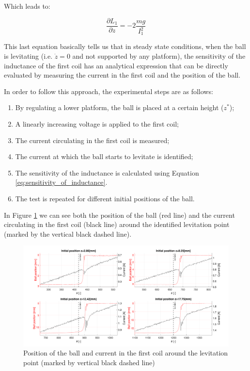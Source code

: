 Which leads to:

\begin{equation}
    \frac{\partial L_1}{\partial z} = -2 \frac{m g}{I_1^2}
    \label{eq:sensitivity_of_inductance}
\end{equation}

This last equation basically tells us that in steady state conditions, when the ball is levitating (i.e. $\dot{z} = 0$ and not supported by any platform), the sensitivity of the inductance of the first coil has an analytical expression that can be directly evaluated by measuring the current in the first coil and the position of the ball.

In order to follow this approach, the experimental steps are as follows:

\begin{enumerate}
    \item By regulating a lower platform, the ball is placed at a certain height ($z^*$);
    \item A linearly increasing voltage is applied to the first coil;
    \item The current circulating in the first coil is measured;
    \item The current at which the ball starts to levitate is identified;
    \item The sensitivity of the inductance is calculated using Equation \ref{eq:sensitivity_of_inductance}.
    \item The test is repeated for different initial positions of the ball.
\end{enumerate}

In Figure \ref{fig:levitation_current} we can see both the position of the ball (red line) and the current circulating in the first coil (black line) around the identified levitation point (marked by the vertical black dashed line).

\begin{figure}[H]
    \centering
    \includegraphics[width=1\textwidth]{img/MATLAB/identification/currents_for_force.pdf}
    \caption{Position of the ball and current in the first coil around the levitation point (marked by vertical black dashed line)}
    \label{fig:levitation_current}
\end{figure}

